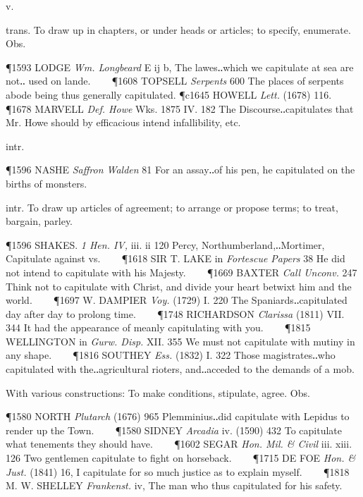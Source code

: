 \begin{description}[wide, labelwidth=!, labelindent=0pt]
 v.

\noindent {}

\vspace{-0.3cm}

\begin{myenumerate}

 trans. To draw up in chapters, or under heads or articles; to specify, enumerate. Obs.

\P 1593 LODGE  \textit{Wm. Longbeard} E ij b, The lawes‥which we capitulate at sea are not‥ used on lande.    
\P 1608 TOPSELL  \textit{Serpents} 600 The places of serpents abode being thus generally capitulated.
\P c1645 HOWELL  \textit{Lett.} (1678) 116.    
\P 1678 MARVELL  \textit{Def. Howe} Wks. 1875 IV. 182  The Discourse‥capitulates that Mr. Howe should by efficacious intend infallibility, etc.

 intr.

\P 1596 NASHE  \textit{Saffron Walden} 81 For an assay‥of his pen, he capitulated on the births of monsters.

 intr. To draw up articles of agreement; to arrange or propose terms; to treat, bargain, parley.

\P 1596 SHAKES.  \textit{1 Hen. IV,} iii. ii 120 Percy, Northumberland,‥Mortimer, Capitulate against vs.    
\P 1618 SIR T. LAKE in \textit{Fortescue Papers} 38 He did not intend to capitulate with his Majesty.    
\P 1669 BAXTER  \textit{Call Unconv.} 247 Think not to capitulate with Christ, and divide your heart betwixt him and the world.    
\P 1697 W. DAMPIER  \textit{Voy.} (1729) I. 220 The Spaniards‥capitulated day after day to prolong time.    
\P 1748 RICHARDSON  \textit{Clarissa} (1811) VII. 344 It had the appearance of meanly capitulating with you.    
\P 1815 WELLINGTON in \textit{Gurw. Disp.} XII. 355 We must not capitulate with mutiny in any shape.    
\P 1816 SOUTHEY  \textit{Ess.} (1832) I. 322 Those magistrates‥who capitulated with the‥agricultural rioters, and‥acceded to the demands of a mob.

 With various constructions: To make conditions, stipulate, agree. Obs.

\P 1580 NORTH  \textit{Plutarch} (1676) 965 Plemminius‥did capitulate with Lepidus to render up the Town.    
\P 1580 SIDNEY  \textit{Arcadia} iv. (1590) 432 To capitulate what tenements they should have.    
\P 1602 SEGAR  \textit{Hon. Mil. \& Civil} iii. xiii. 126 Two gentlemen capitulate to fight on horseback.    
\P 1715 DE FOE  \textit{Hon. \& Just.} (1841) 16, I capitulate for so much justice as to explain myself.    
\P 1818 M. W. SHELLEY  \textit{Frankenst.} iv, The man who thus capitulated for his safety.


\end{myenumerate}
\end{description}
